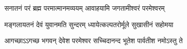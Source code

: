 \twolineshloka
{सनातनं परं ब्रह्म परमात्मानमव्ययम्}
{आवाहयामि जगतामीश्वरं परमेश्वरम्}

\twolineshloka
{मङ्गलायतनं देवं युवानमति सुन्दरम्}
{ध्यायेत्कल्पतरोर्मूले सुखासीनं सहोमया}

\twolineshloka
{आगच्छाऽऽगच्छ भगवन् देवेश परमेश्वर}
{सच्चिदानन्द भूतेश पार्वतीश नमोऽस्तु ते}

{\small \closesection}













